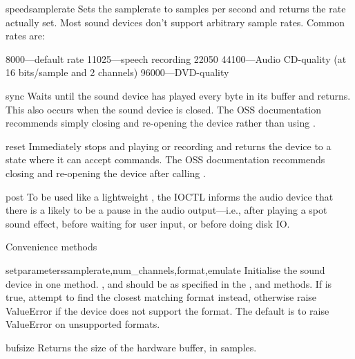 \begin{methoddesc}{speed}{samplerate}
Sets the samplerate to  samples per second and returns
the rate actually set.  Most sound devices don't support arbitrary
sample rates.  Common rates are:

8000---default rate
11025---speech recording
22050
44100---Audio CD-quality (at 16 bits/sample and 2 channels)
96000---DVD-quality
\end{methoddesc}

\begin{methoddesc}{sync}
Waits until the sound device has played every byte in its buffer and
returns.  This also occurs when the sound device is closed.  The OSS
documentation recommends simply closing and re-opening the device rather
than using .
\end{methoddesc}

\begin{methoddesc}{reset}
Immediately stops and playing or recording and returns the device to a
state where it can accept commands.  The OSS documentation recommends
closing and re-opening the device after calling .
\end{methoddesc}

\begin{methoddesc}{post}
To be used like a lightweight , the  IOCTL informs
the audio device that there is a likely to be a pause in the audio
output---i.e., after playing a spot sound effect, before waiting for
user input, or before doing disk IO.
\end{methoddesc}

Convenience methods

\begin{methoddesc}{setparameters}{samplerate,num_channels,format,emulate}
Initialise the sound device in one method.  ,
 and  should be as specified in the
,  and  methods.  If
 is true, attempt to find the closest matching format
instead, otherwise raise ValueError if the device does not support the
format.  The default is to raise ValueError on unsupported formats.
\end{methoddesc}

\begin{methoddesc}{bufsize}{}
Returns the size of the hardware buffer, in samples.
\end{methoddesc}

